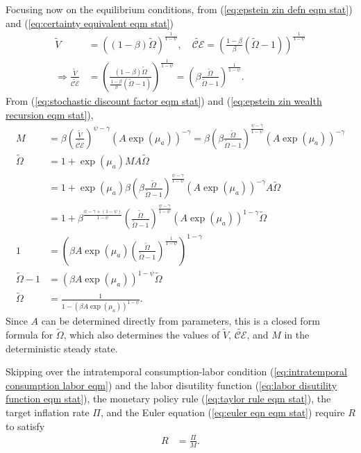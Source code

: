 \documentclass[12 pt, oneside]{article}
\theoremstyle{definition}
\theoremstyle{definition}
\theoremstyle{definition}
\newcommand{\calC}{\mathcal{C}}
\newcommand{\calE}{\mathcal{E}}
\newcommand{\RA}{\Rightarrow}
\begin{document}
Focusing now on the equilibrium conditions, from (\ref{eq:epstein zin defn eqm stat}) and (\ref{eq:certainty equivalent eqm stat})
\begin{align*}
  \tilde{V} & = ((1 - \beta) \tilde{\Omega})^{\frac{1}{1 - \psi}},\quad \tilde{\calC\calE} = \left(\frac{1 - \beta}{\beta} (\tilde{\Omega} - 1)\right)^{\frac{1}{1 - \psi}}\\
  \RA \frac{\tilde{V}}{\tilde{\calC\calE}} & = \left(\frac{(1 - \beta)\tilde{\Omega}}{\frac{1 - \beta}{\beta} (\tilde{\Omega} - 1)}\right)^{\frac{1}{1 - \psi}} = \left(\beta\frac{\tilde{\Omega}}{\tilde{\Omega} - 1}\right)^{\frac{1}{1 - \psi}}.
\end{align*}
From (\ref{eq:stochastic discount factor eqm stat}) and (\ref{eq:epstein zin wealth recursion eqm stat}),
\begin{align*}
  M & = \beta\left(\frac{\tilde{V}}{\tilde{\calC\calE}}\right)^{\psi - \gamma}(A\exp(\mu_a))^{ - \gamma} = \beta\left(\beta\frac{\tilde{\Omega}}{\tilde{\Omega} - 1}\right)^{\frac{\psi - \gamma}{1 - \psi}}(A\exp(\mu_a))^{ - \gamma}\\
  \tilde{\Omega} & = 1 + \exp(\mu_a)M A \tilde{\Omega}\\
    & = 1 + \exp(\mu_a)\beta\left(\beta\frac{\tilde{\Omega}}{\tilde{\Omega} - 1}\right)^{\frac{\psi - \gamma}{1 - \psi}}(A\exp(\mu_a))^{ - \gamma} A \tilde{\Omega}\\
    & = 1 +\beta^{\frac{\psi - \gamma + (1 - \psi)}{1 - \psi}}\left(\frac{\tilde{\Omega}}{\tilde{\Omega} - 1}\right)^{\frac{\psi - \gamma}{1 - \psi}}(A\exp(\mu_a))^{1 - \gamma} \tilde{\Omega}\\
  1 & =  \left(\beta A \exp(\mu_a)\left(\frac{\tilde{\Omega}}{\tilde{\Omega} - 1}\right)^{\frac{1}{1 - \psi}}\right)^{1 - \gamma}\\
  \tilde{\Omega} - 1 & = (\beta A \exp(\mu_a))^{1 - \psi} \tilde{\Omega}\\
  \tilde{\Omega} & = \frac{1}{1 - (\beta A \exp(\mu_a))^{1 - \psi}}.
\end{align*}
Since $A$ can be determined directly from parameters, this is a closed form formula for $\tilde{\Omega}$, which also determines the values of $\tilde{V}$, $\tilde{\calC\calE}$, and $M$ in the deterministic steady state.

Skipping over the intratemporal consumption-labor condition (\ref{eq:intratemporal consumption labor eqm}) and the labor disutility function (\ref{eq:labor disutility function eqm stat}), the monetary policy rule (\ref{eq:taylor rule eqm stat}), the target inflation rate $\Pi$, and the Euler equation (\ref{eq:euler eqn eqm stat}) require $R$ to satisfy
\begin{align}
  R & = \frac{\Pi}{M}.
\end{align}
\end{document}
